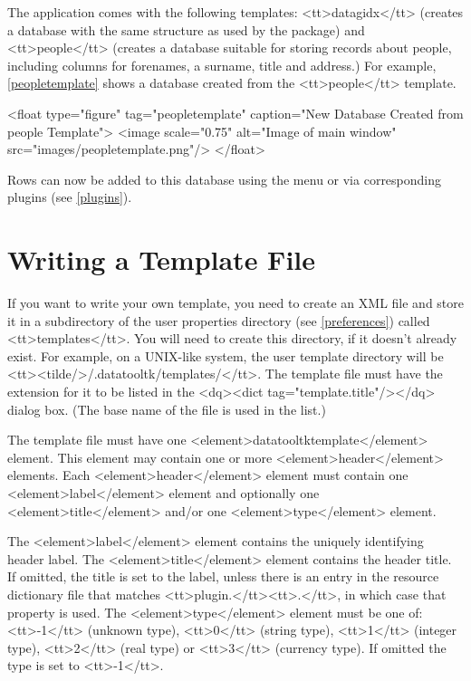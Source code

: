    The  application comes with the following templates: 
   <tt>datagidx</tt> (creates a database with the same structure as
   used by the  package) and <tt>people</tt> (creates
   a database suitable for storing records about people, including
   columns for forenames, a surname, title and address.) For example,
   \autoref{peopletemplate} shows a database created from the 
   <tt>people</tt> template.

   <float type="figure" tag="peopletemplate" 
      caption="New Database Created from people Template">
     <image scale="0.75" alt="Image of main window"
        src="images/peopletemplate.png"/>
   </float>

   Rows can now be added to this database using the 
   menu or via corresponding plugins (see \autoref{plugins}).


\section{Writing a Template File}\label{writingtemplates}

   If you want to write your own template, you need to create an XML file
   and store it in a subdirectory  of the  
   user properties directory (see \autoref{preferences}) called 
   <tt>templates</tt>. You will need to create this directory, if it doesn't
   already exist. For example, on a UNIX-like system, the user
   template directory will be <tt><tilde/>/.datatooltk/templates/</tt>.
   The template file must have the extension  for it to be
   listed in the <dq><dict tag="template.title"/></dq> dialog box. (The base
   name of the file is used in the list.)


   The template file must have one <element>datatooltktemplate</element> element. This
   element may contain one or more <element>header</element> elements. Each 
   <element>header</element> element must contain one <element>label</element> element and 
   optionally one <element>title</element> and/or one <element>type</element> element.


   The <element>label</element> element contains the uniquely identifying header label.
   The <element>title</element> element contains the header title. If omitted, the
   title is set to the label, unless there is an entry in the resource
   dictionary file that matches <tt>plugin.</tt><tt>.</tt>, 
   in which case that property is used. The <element>type</element> element must be one of:
   <tt>-1</tt> (unknown type), <tt>0</tt> (string type), <tt>1</tt> (integer 
   type), <tt>2</tt> (real type) or <tt>3</tt> (currency type). If omitted the 
   type is set to <tt>-1</tt>.

